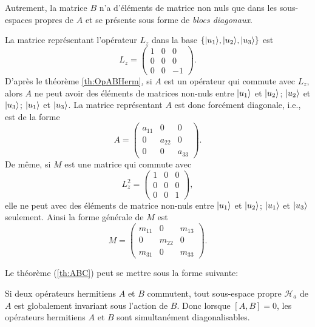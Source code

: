 Autrement, la matrice $B$ n'a d'éléments de matrice non nuls que dans les
sous-espaces propres de $A$ et se présente sous forme de \emph{blocs diagonaux}.

\begin{example}
La matrice représentant l'opérateur $L_{z}$ dans la base $\{\vert u_1\rangle,
\vert u_{2}\rangle,\vert u_3\rangle\}$ est
\begin{equation}
L_{z}=\begin{pmatrix}
1 & 0 & 0\\
0 & 0 & 0\\
0 & 0 & -1
\end{pmatrix} .
\end{equation}
D'après le théorème \ref{th:OpABHerm}, si $A$ est un opérateur qui commute
avec $L_{z},$ alors $A$ ne peut avoir des éléments de matrices non-nuls entre
$\vert u_1\rangle$ et $\vert u_{2}\rangle$; $\vert u_{2}\rangle$ et $\vert u_3\rangle$; $\vert u_1\rangle$ et
$\vert u_3\rangle$. La matrice représentant $A$ est donc forcément diagonale, i.e.,
est de la forme%
\begin{equation}
A=\begin{pmatrix}
a_{11} & 0 & 0\\
0 & a_{22} & 0\\
0 & 0 & a_{33}%
\end{pmatrix} .
\end{equation}
De même, si $M$ est une matrice qui commute avec
\begin{equation}
L_{z}^{2}=\begin{pmatrix}
1 & 0 & 0\\
0 & 0 & 0\\
0 & 0 & 1
\end{pmatrix} ,
\end{equation}
elle ne peut avec des éléments de matrice non-nuls entre $\vert u_1\rangle$ et
$\vert u_{2}\rangle$; $\vert u_1\rangle$ et $\vert u_3\rangle$ seulement. Ainsi la forme générale
de $M$ est%
\begin{equation}
M=\begin{pmatrix}
m_{11} & 0 & m_{13}\\
0 & m_{22} & 0\\
m_{31} & 0 & m_{33}%
\end{pmatrix} .
\end{equation}

\end{example}

Le théorème (\ref{th:ABC}) peut se mettre sous la forme suivante:

\colorbox[gray]{0.8}{
\parbox[c]{0.9\textwidth}{
\begin{theorem}
 Si deux opérateurs hermitiens $A$ et $B$ commutent, tout sous-espace propre
$\mathcal{H}_{a}$ de $A$ est globalement invariant sous l'action de $B$. Donc
lorsque $[A,B] =0$, les opérateurs hermitiens $A$ et $B$ sont simultanément
diagonalisables.
\end{theorem}
}}\medskip

